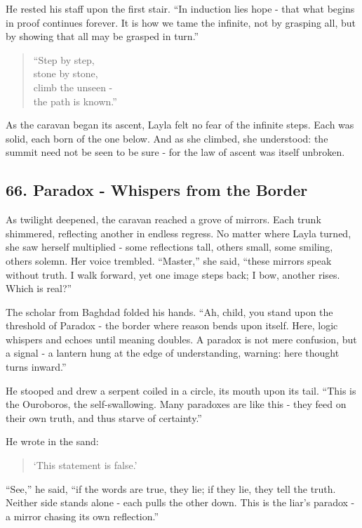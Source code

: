 \documentclass[
  letterpaper,
  DIV=11,
  numbers=noendperiod]{scrreprt}
\begin{document}
He rested his staff upon the first stair. ``In induction lies hope -
that what begins in proof continues forever. It is how we tame the
infinite, not by grasping all, but by showing that all may be grasped in
turn.''

\begin{quote}
``Step by step,\\
stone by stone,\\
climb the unseen -\\
the path is known.''
\end{quote}

As the caravan began its ascent, Layla felt no fear of the infinite
steps. Each was solid, each born of the one below. And as she climbed,
she understood: the summit need not be seen to be sure - for the law of
ascent was itself unbroken.

\subsection{66. Paradox - Whispers from the
Border}\label{paradox---whispers-from-the-border}

As twilight deepened, the caravan reached a grove of mirrors. Each trunk
shimmered, reflecting another in endless regress. No matter where Layla
turned, she saw herself multiplied - some reflections tall, others
small, some smiling, others solemn. Her voice trembled. ``Master,'' she
said, ``these mirrors speak without truth. I walk forward, yet one image
steps back; I bow, another rises. Which is real?''

The scholar from Baghdad folded his hands. ``Ah, child, you stand upon
the threshold of Paradox - the border where reason bends upon itself.
Here, logic whispers and echoes until meaning doubles. A paradox is not
mere confusion, but a signal - a lantern hung at the edge of
understanding, warning: here thought turns inward.''

He stooped and drew a serpent coiled in a circle, its mouth upon its
tail. ``This is the Ouroboros, the self-swallowing. Many paradoxes are
like this - they feed on their own truth, and thus starve of
certainty.''

He wrote in the sand:

\begin{quote}
`This statement is false.'
\end{quote}

``See,'' he said, ``if the words are true, they lie; if they lie, they
tell the truth. Neither side stands alone - each pulls the other down.
This is the liar's paradox - a mirror chasing its own reflection.''
\end{document}
